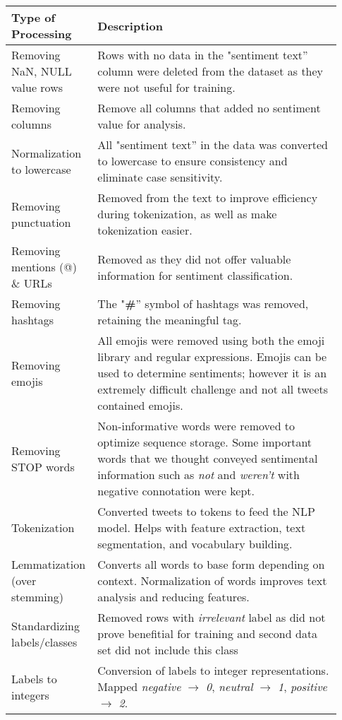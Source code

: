 \begin{table}[!ht]
    \centering
        \begin{tabular}{|p{0.2\linewidth}|p{0.73\linewidth}|}
            \hline
            Type of Processing & Description \\
            \hline
            Removing NaN, NULL value rows &  Rows with no data in the "sentiment text” column were deleted from the dataset as they were not useful for training.\\
            \hline
            Removing columns & Remove all columns that added no sentiment value for analysis. \\
            \hline
            Normalization to lowercase & All "sentiment text” in the data was converted to lowercase to ensure consistency and eliminate case sensitivity. \\
            \hline
            Removing punctuation & Removed from the text to improve efficiency during tokenization, as well as make tokenization easier. \\
            \hline
            Removing mentions (@) \& URLs & Removed as they did not offer valuable information for sentiment classification. \\
            \hline
            Removing hashtags & The "\textbf{\#}” symbol of hashtags was removed, retaining the meaningful tag. \\
            \hline
            Removing emojis & All emojis were removed using both the emoji library and regular expressions. Emojis can be used to determine sentiments; however it is an extremely difficult challenge and not all tweets contained emojis. \\
            \hline
            Removing STOP words & Non-informative words were removed to optimize sequence storage. Some important words that we thought conveyed sentimental information such as \textit{not} and \textit{weren’t} with negative connotation were kept. \\
            \hline
            Tokenization & Converted tweets to tokens to feed the NLP model. Helps with feature extraction, text segmentation, and vocabulary building. \\
            \hline
            Lemmatization (over stemming) & Converts all words to base form depending on context. Normalization of words improves text analysis and reducing features. \\
            \hline
            Standardizing labels/classes & Removed rows with \textit{irrelevant} label as did not prove benefitial for training and second data set did not include this class \\
            \hline
            Labels to integers & Conversion of labels to integer representations. Mapped \textit{negative} $\rightarrow$ \textit{0}, \textit{neutral} $\rightarrow$ \textit{1}, \textit{positive} $\rightarrow$ \textit{2}.\\
            \hline
        \end{tabular}
\end{table}
\vspace{-1em}
